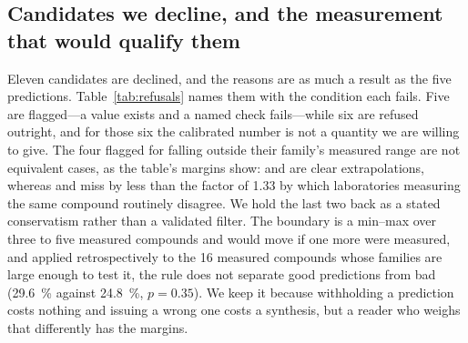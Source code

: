 \subsection{Candidates we decline, and the measurement that would qualify them}
\label{sec:refusals}
\label{sec:whyfive}
\label{sec:novel}

Eleven candidates are declined, and the reasons are as much a result as the five predictions.
Table~\ref{tab:refusals} names them with the condition each fails. Five are flagged---a value
exists and a named check fails---while six are refused outright, and for those six the calibrated
number is not a quantity we are willing to give. The four flagged for falling outside their family's
measured range are not equivalent cases, as the table's margins show:  and 
are clear extrapolations, whereas  and  miss by less than the factor of
\num{1.33} by which laboratories measuring the same compound routinely disagree. We hold the last
two back as a stated conservatism rather than a validated filter. The boundary is a min--max over
three to five measured compounds and would move if one more were measured, and applied
retrospectively to the \num{16} measured compounds whose families are large enough to test it, the
rule does not separate good predictions from bad (\SI{29.6}{\percent} against \SI{24.8}{\percent},
$p=\num{0.35}$). We keep it because withholding a prediction costs nothing and issuing a wrong one
costs a synthesis, but a reader who weighs that differently has the margins.

